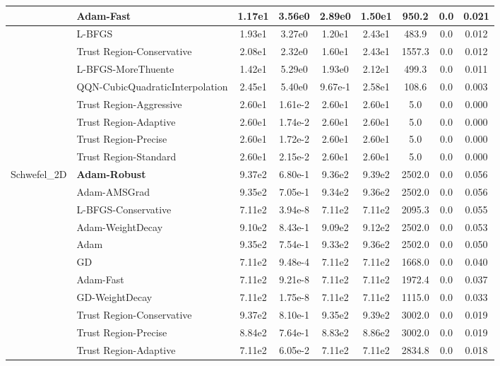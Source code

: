 \documentclass[10pt]{article}
\begin{document}
\begin{longtable}{|l|l|c|c|c|c|c|c|c|}
\hline
 & Adam-Fast & 1.17e1 & 3.56e0 & 2.89e0 & 1.50e1 & 950.2 & 0.0 & 0.021 \\
\hline
 & L-BFGS & 1.93e1 & 3.27e0 & 1.20e1 & 2.43e1 & 483.9 & 0.0 & 0.012 \\
\hline
 & Trust Region-Conservative & 2.08e1 & 2.32e0 & 1.60e1 & 2.43e1 & 1557.3 & 0.0 & 0.012 \\
\hline
 & L-BFGS-MoreThuente & 1.42e1 & 5.29e0 & 1.93e0 & 2.12e1 & 499.3 & 0.0 & 0.011 \\
\hline
 & QQN-CubicQuadraticInterpolation & 2.45e1 & 5.40e0 & 9.67e-1 & 2.58e1 & 108.6 & 0.0 & 0.003 \\
\hline
 & Trust Region-Aggressive & 2.60e1 & 1.61e-2 & 2.60e1 & 2.60e1 & 5.0 & 0.0 & 0.000 \\
\hline
 & Trust Region-Adaptive & 2.60e1 & 1.74e-2 & 2.60e1 & 2.60e1 & 5.0 & 0.0 & 0.000 \\
\hline
 & Trust Region-Precise & 2.60e1 & 1.72e-2 & 2.60e1 & 2.60e1 & 5.0 & 0.0 & 0.000 \\
\hline
 & Trust Region-Standard & 2.60e1 & 2.15e-2 & 2.60e1 & 2.60e1 & 5.0 & 0.0 & 0.000 \\
Schwefel\_2D & \textbf{Adam-Robust} & 9.37e2 & 6.80e-1 & 9.36e2 & 9.39e2 & 2502.0 & 0.0 & 0.056 \\
\hline
 & Adam-AMSGrad & 9.35e2 & 7.05e-1 & 9.34e2 & 9.36e2 & 2502.0 & 0.0 & 0.056 \\
\hline
 & L-BFGS-Conservative & 7.11e2 & 3.94e-8 & 7.11e2 & 7.11e2 & 2095.3 & 0.0 & 0.055 \\
\hline
 & Adam-WeightDecay & 9.10e2 & 8.43e-1 & 9.09e2 & 9.12e2 & 2502.0 & 0.0 & 0.053 \\
\hline
 & Adam & 9.35e2 & 7.54e-1 & 9.33e2 & 9.36e2 & 2502.0 & 0.0 & 0.050 \\
\hline
 & GD & 7.11e2 & 9.48e-4 & 7.11e2 & 7.11e2 & 1668.0 & 0.0 & 0.040 \\
\hline
 & Adam-Fast & 7.11e2 & 9.21e-8 & 7.11e2 & 7.11e2 & 1972.4 & 0.0 & 0.037 \\
\hline
 & GD-WeightDecay & 7.11e2 & 1.75e-8 & 7.11e2 & 7.11e2 & 1115.0 & 0.0 & 0.033 \\
\hline
 & Trust Region-Conservative & 9.37e2 & 8.10e-1 & 9.35e2 & 9.39e2 & 3002.0 & 0.0 & 0.019 \\
\hline
 & Trust Region-Precise & 8.84e2 & 7.64e-1 & 8.83e2 & 8.86e2 & 3002.0 & 0.0 & 0.019 \\
\hline
 & Trust Region-Adaptive & 7.11e2 & 6.05e-2 & 7.11e2 & 7.11e2 & 2834.8 & 0.0 & 0.018 \\

\end{longtable}
\end{document}
